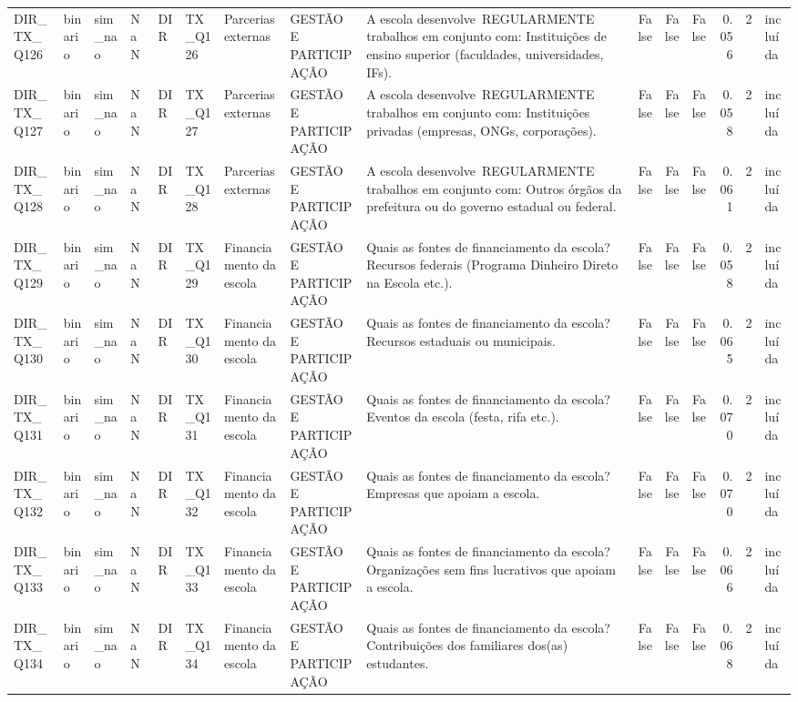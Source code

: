 \begin{tabular}{lllllllllrrrrrl}
DIR\_TX\_Q126 & binario & sim\_nao & NaN & DIR & TX\_Q126 & Parcerias externas & GESTÃO E PARTICIPAÇÃO & A escola desenvolve REGULARMENTE trabalhos em conjunto com: Instituições de ensino superior (faculdades, universidades, IFs). & False & False & False & 0.056 & 2 & incluída \\
DIR\_TX\_Q127 & binario & sim\_nao & NaN & DIR & TX\_Q127 & Parcerias externas & GESTÃO E PARTICIPAÇÃO & A escola desenvolve REGULARMENTE trabalhos em conjunto com: Instituições privadas (empresas, ONGs, corporações). & False & False & False & 0.058 & 2 & incluída \\
DIR\_TX\_Q128 & binario & sim\_nao & NaN & DIR & TX\_Q128 & Parcerias externas & GESTÃO E PARTICIPAÇÃO & A escola desenvolve REGULARMENTE trabalhos em conjunto com: Outros órgãos da prefeitura ou do governo estadual ou federal. & False & False & False & 0.061 & 2 & incluída \\
DIR\_TX\_Q129 & binario & sim\_nao & NaN & DIR & TX\_Q129 & Financiamento da escola & GESTÃO E PARTICIPAÇÃO & Quais as fontes de financiamento da escola? Recursos federais (Programa Dinheiro Direto na Escola etc.). & False & False & False & 0.058 & 2 & incluída \\
DIR\_TX\_Q130 & binario & sim\_nao & NaN & DIR & TX\_Q130 & Financiamento da escola & GESTÃO E PARTICIPAÇÃO & Quais as fontes de financiamento da escola? Recursos estaduais ou municipais. & False & False & False & 0.065 & 2 & incluída \\
DIR\_TX\_Q131 & binario & sim\_nao & NaN & DIR & TX\_Q131 & Financiamento da escola & GESTÃO E PARTICIPAÇÃO & Quais as fontes de financiamento da escola? Eventos da escola (festa, rifa etc.). & False & False & False & 0.070 & 2 & incluída \\
DIR\_TX\_Q132 & binario & sim\_nao & NaN & DIR & TX\_Q132 & Financiamento da escola & GESTÃO E PARTICIPAÇÃO & Quais as fontes de financiamento da escola? Empresas que apoiam a escola. & False & False & False & 0.070 & 2 & incluída \\
DIR\_TX\_Q133 & binario & sim\_nao & NaN & DIR & TX\_Q133 & Financiamento da escola & GESTÃO E PARTICIPAÇÃO & Quais as fontes de financiamento da escola? Organizações sem fins lucrativos que apoiam a escola. & False & False & False & 0.066 & 2 & incluída \\
DIR\_TX\_Q134 & binario & sim\_nao & NaN & DIR & TX\_Q134 & Financiamento da escola & GESTÃO E PARTICIPAÇÃO & Quais as fontes de financiamento da escola? Contribuições dos familiares dos(as) estudantes. & False & False & False & 0.068 & 2 & incluída \\

\end{tabular}
